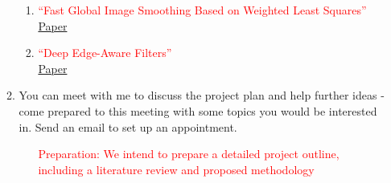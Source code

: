\documentclass[11pt]{article}
\begin{document}
\begin{enumerate}
\begin{enumerate}
\begin{enumerate}
    \item \textcolor{red}{``Fast Global Image Smoothing Based on Weighted Least Squares''} \\
    \href{https://ieeexplore.ieee.org/stamp/stamp.jsp?tp=\&arnumber=6942220}{Paper}

    \item \textcolor{red}{``Deep Edge-Aware Filters''} \\
    \href{https://proceedings.mlr.press/v37/xub15.pdf}{Paper}

\end{enumerate}


  
  \item You can meet with me to discuss the project plan and help
    further ideas - come prepared to this meeting with some topics you
    would be interested in. Send an email to set up an appointment.

\begin{enumerate}
\item[\textcolor{red}{Preparation:}]
\textcolor{red}{We intend to prepare a detailed project outline, including a literature review and proposed methodology}
\end{enumerate}
    
  \end{enumerate}

\end{enumerate}
\end{document}
